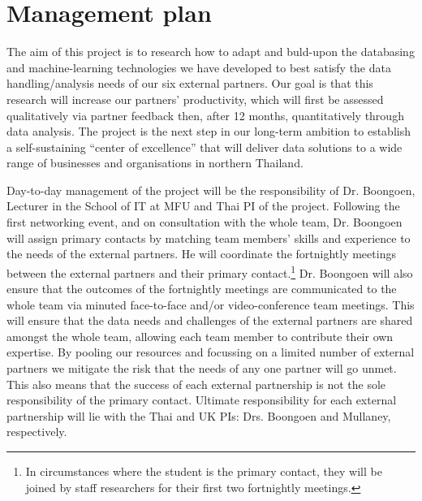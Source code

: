 \documentclass[11pt]{article}
\begin{document}

\section{Management plan}
The aim of this project is to research how to adapt and buld-upon the databasing and machine-learning technologies we have developed to best satisfy the data handling/analysis needs of our six external partners. Our goal is that this research will increase our partners' productivity, which will first be assessed qualitatively via partner feedback then, after 12 months, quantitatively through data analysis. The project is the next step in our long-term ambition to establish a self-sustaining ``center of excellence'' that will deliver data solutions to a wide range of businesses and organisations in northern Thailand.

\vspace{2mm}
\noindent
Day-to-day management of the project will be the responsibility of Dr. Boongoen, Lecturer in the School of IT at MFU and Thai PI of the project. Following the first networking event, and on consultation with the whole team, Dr. Boongoen will assign primary contacts by matching team members' skills and experience to the needs of the external partners. He will coordinate the fortnightly meetings between the external partners and their primary contact.\footnote{In circumstances where the student is the primary contact, they will be joined by staff researchers for their first two fortnightly meetings.} Dr. Boongoen will also ensure that the outcomes of the fortnightly meetings are communicated to the whole team via minuted face-to-face and/or video-conference team meetings. This will ensure that the data needs and challenges of the external partners are shared amongst the whole team, allowing each team member to contribute their own expertise. By pooling our resources and focussing on a limited number of external partners we mitigate the risk that the needs of any one partner will go unmet. This also means that the success of each external partnership is not the sole responsibility of the primary contact. Ultimate responsibility for each external partnership will lie with the Thai and UK PIs: Drs. Boongoen and Mullaney, respectively. 
\end{document}
